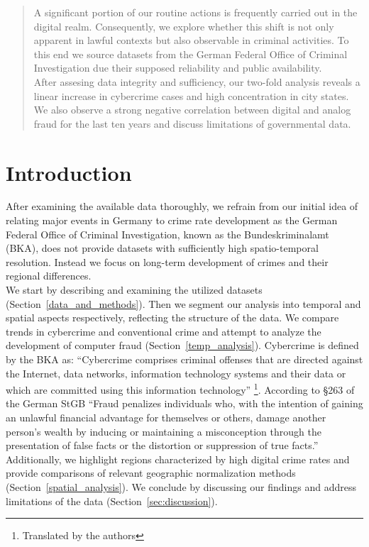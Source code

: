\documentclass{article}
\theoremstyle{plain}
\theoremstyle{definition}
\theoremstyle{remark}
\begin{document}
\printAffiliationsAndNotice{\icmlEqualContribution} %

\begin{abstract}

A significant portion of our routine actions is frequently carried out in the digital realm. Consequently, we explore whether this shift is not only apparent in lawful contexts but also observable in criminal activities. To this end we source datasets from the German Federal Office of Criminal Investigation due their supposed reliability and public availability.\\
After assesing data integrity and sufficiency, our two-fold analysis reveals a linear increase in cybercrime cases and high concentration in city states. We also observe a strong negative correlation between digital and analog fraud for the last ten years and discuss limitations of governmental data.

\end{abstract}


\section{Introduction}
\label{sec:intro}

After examining the available data thoroughly, we refrain from our initial idea of relating major events in Germany to crime rate development as the  German Federal Office of Criminal Investigation, known as the Bundeskriminalamt (BKA), does not provide datasets with sufficiently high spatio-temporal resolution. Instead we focus on long-term development of crimes and their regional differences.\\
We start by describing and examining the utilized datasets (Section~\ref{data_and_methods}). Then we segment our analysis into temporal and spatial aspects respectively, reflecting the structure of the data. We compare trends in cybercrime and conventional crime and attempt to analyze the development of computer fraud (Section~\ref{temp_analysis}). Cybercrime is defined by the BKA as: \textquotedblleft{}Cybercrime comprises criminal offenses that are directed against the Internet, data networks, information technology
systems and their data or which are committed using this information technology\textquotedblright{} \citep{BKA2014cybercrimedef}\footnote{\label{note1}Translated by the authors}. 
According to §263 of the German StGB \textquotedblleft{}Fraud penalizes individuals who, with the intention of gaining an unlawful financial advantage for themselves or others, damage another person's wealth by inducing or maintaining a misconception through the presentation of false facts or the distortion or suppression of true facts.\textquotedblright{} \citep{stgb_263}
Additionally, we highlight regions characterized by high digital crime rates and provide comparisons of relevant geographic normalization methods (Section~\ref{spatial_analysis}). We conclude by discussing our findings and address limitations of the data (Section~\ref{sec:discussion}). 
\end{document}

